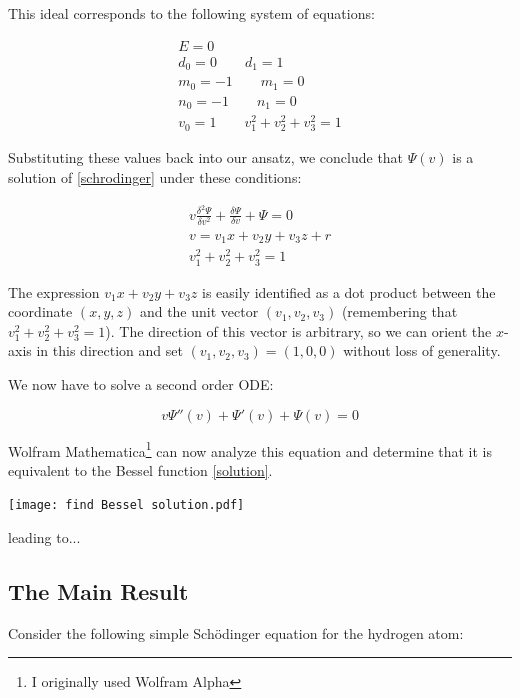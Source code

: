 \documentclass{article}
\begin{document}
This ideal corresponds to the following system of equations:

\begin{equation}
\begin{gathered}
E = 0 \\
d_0 = 0 \qquad
d_1 = 1 \\
m_0 = -1 \qquad
m_1 = 0 \\
n_0 = -1 \qquad
n_1 = 0 \\
v_0 = 1 \qquad
v_1^2 + v_2^2 + v_3^2 = 1
\end{gathered}
\end{equation}

Substituting these values back into our ansatz, we conclude that $\Psi(v)$
is a solution of \eqref{schrodinger} under these conditions:

\begin{equation}
\label{related solution}
\begin{gathered}
v \frac{\delta^2\Psi}{\delta v^2} + \frac{\delta\Psi}{\delta v} + \Psi = 0 \\
v = v_1 x+ v_2 y+ v_3 z+r \\
v_1^2 + v_2^2 + v_3^2 = 1
\end{gathered}
\end{equation}

The expression $v_1 x + v_2 y + v_3 z$ is easily identified as a dot product between
the coordinate $(x,y,z)$ and the unit vector $(v_1, v_2, v_3)$ (remembering
that $v_1^2 + v_2^2 + v_3^2 = 1$).  The direction of this vector is arbitrary,
so we can orient the $x$-axis in this direction and set $(v_1, v_2, v_3) = (1,0,0)$
without loss of generality.

We now have to solve a second order ODE:

\begin{equation}
v \Psi''(v) + \Psi'(v) + \Psi(v) = 0
\end{equation}

Wolfram Mathematica\footnote{I originally used Wolfram Alpha} can now
analyze this equation and determine that it is equivalent
to the Bessel function \eqref{solution}.

\texttt{[image: find Bessel solution.pdf]}

leading to...

\subsection*{The Main Result}
\parskip 0pt

Consider the following simple Sch\"odinger equation for the hydrogen atom:
\end{document}
